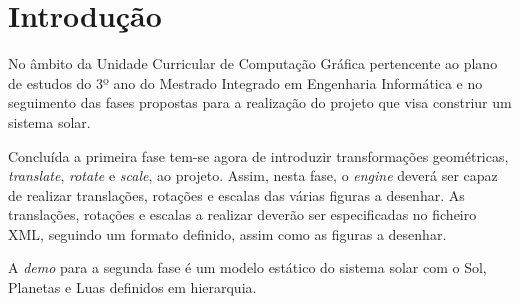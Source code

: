 \chapter{Introdução}
\label{cap:intro}

No âmbito da Unidade Curricular de Computação Gráfica pertencente ao plano de estudos do 3º ano do Mestrado Integrado em Engenharia Informática e no seguimento das fases propostas para a realização do projeto que visa constriur um sistema solar. 

Concluída a primeira fase tem-se agora de introduzir transformações geométricas, \textit{translate}, \textit{rotate} e \textit{scale}, ao projeto. Assim, nesta fase, o \textit{engine} deverá ser capaz de realizar translações, rotações e escalas das várias figuras a desenhar.
As translações, rotações e escalas a realizar deverão ser especificadas no ficheiro XML, seguindo um formato definido, assim como as figuras a desenhar.

A \textit{demo} para a segunda fase é um modelo estático do sistema solar com
o Sol, Planetas e Luas definidos em hierarquia.
